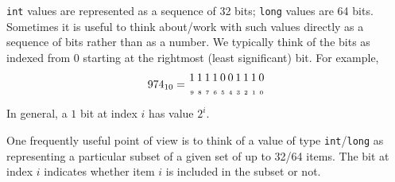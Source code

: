 \documentclass[10pt]{book}
\begin{document}
\texttt{int} values are represented as a sequence of 32 bits;
\texttt{long} values are 64 bits.  Sometimes it is useful to think
about/work with such values directly as a sequence of bits rather than
as a number. We typically think of the bits as indexed from $0$
starting at the rightmost (least significant) bit.  For example,
\[ \arraycolsep=1pt
  974_{10} =
  \begin{array}{cccccccccc}
    1&1&1&1&0&0&1&1&1&0 \\
      \scriptscriptstyle 9
     &\scriptscriptstyle 8
     &\scriptscriptstyle 7
     &\scriptscriptstyle 6
     &\scriptscriptstyle 5
     &\scriptscriptstyle 4
     &\scriptscriptstyle 3
     &\scriptscriptstyle 2
     &\scriptscriptstyle 1
     &\scriptscriptstyle 0
  \end{array} \]
In general, a $1$ bit at index $i$ has value $2^i$.

One frequently useful point of view is to think of a value of type
\texttt{int}/\texttt{long} as representing a particular subset of a
given set of up to 32/64 items.  The bit at index $i$ indicates
whether item $i$ is included in the subset or not.
\end{document}

